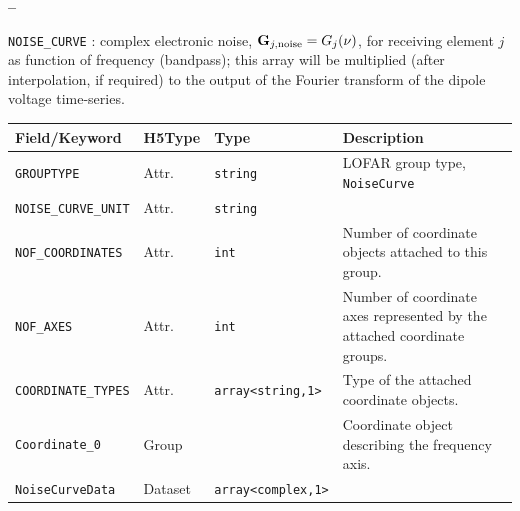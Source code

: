 \documentclass[a4paper,10pt,bibtotoc]{scrartcl}
\begin{document}
\begin{list}{\textbf{--}}{}
{%
  }
\item \verb|NOISE_CURVE| : complex electronic noise, $\mathbf G_{j,\rm noise} = G_{j}(\nu)$,
  for receiving element $j$ as function of frequency (bandpass); this array
  will be multiplied (after interpolation, if required) to the output of the
  Fourier transform of the dipole voltage time-series.
  \begin{table}[ht]
    \centering
    \begin{tabular}{|lllp{6cm}|}
      \hline
      \sc Field/Keyword & \sc H5Type & \sc Type & Description \\
      \hline \hline
      \verb|GROUPTYPE|        & Attr. & \verb|string| & LOFAR group type,
      \verb|NoiseCurve| \\
      \verb|NOISE_CURVE_UNIT|  & Attr. & \verb|string|          &  \\
      \verb|NOF_COORDINATES|  & Attr. & \verb|int|             &
      Number of coordinate objects attached to this group. \\
      \verb|NOF_AXES|         & Attr. & \verb|int|             &
      Number of coordinate axes represented by the attached coordinate
      groups. \\
      \verb|COORDINATE_TYPES| & Attr. & \verb|array<string,1>| & Type 
      of the attached coordinate objects. \\
      \hline 
      \verb|Coordinate_0|      & Group   &             & Coordinate
      object describing the frequency axis. \\
      \verb|NoiseCurveData|  & Dataset & \verb|array<complex,1>| &  \\
      \hline
    \end{tabular}

\end{table}
\end{list}
\end{document}
